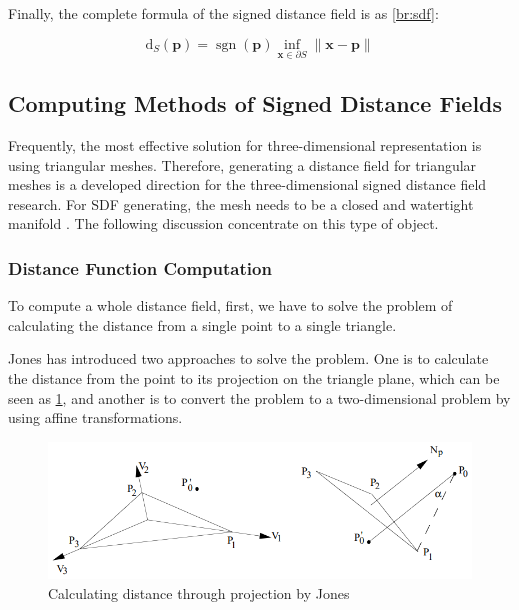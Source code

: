 Finally, the complete formula of the signed distance field is as \ref{br:sdf}:

\begin{equation}
    \mathrm{d}_{S}(\mathbf{p})=\operatorname{sgn}(\mathbf{p}) \inf _{\mathbf{x} \in \partial S}\|\mathbf{x}-\mathbf{p}\|
    \label{br:sdf}
\end{equation}

\subsection{Computing Methods of Signed Distance Fields}
\label{br:algorithm1}

Frequently, the most effective solution for three-dimensional representation is using triangular meshes. Therefore, generating a distance field for triangular meshes is a developed direction for the three-dimensional signed distance field research. For SDF generating, the mesh needs to be a closed and watertight manifold \cite{SDFSurvey}. The following discussion concentrate on this type of object.

\subsubsection{Distance Function Computation}
\label{br:dfc}

To compute a whole distance field, first, we have to solve the problem of calculating the distance from a single point to a single triangle.

\hspace*{\fill}

Jones \cite{jones19953d} has introduced two approaches to solve the problem. One is to calculate the distance from the point to its projection on the triangle plane, which can be seen as \ref{br:jonesproj}, and another is to convert the problem to a two-dimensional problem by using affine transformations.

\begin{figure}[htbp]
    \centering
    \includegraphics[width=12cm]{Images/Chap2/JonesDist.png}
    \caption{Calculating distance through projection by Jones\cite{jones19953d}}
    \label{br:jonesproj}
\end{figure}

